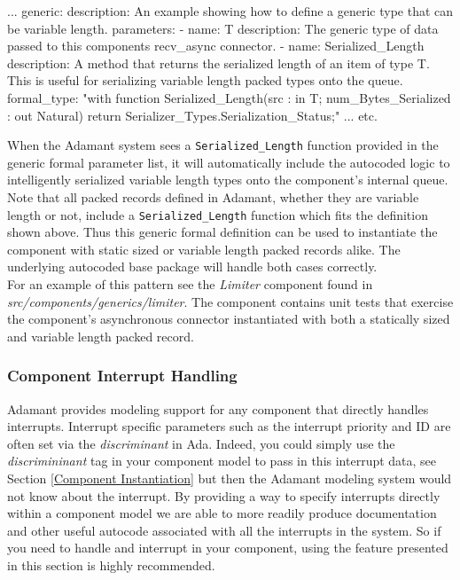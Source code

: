 \vspace{5mm} %
\begin{yamlcode}
...
generic:
  description: An example showing how to define a generic type that can be variable length.
  parameters:
    - name: T
      description: The generic type of data passed to this components recv_async connector.
    - name: Serialized_Length
      description: A method that returns the serialized length of an item of type T. This is useful for serializing variable length packed types onto the queue.
      formal_type: "with function Serialized_Length(src : in T; num_Bytes_Serialized : out Natural) return Serializer_Types.Serialization_Status;"
...
etc.
\end{yamlcode}
\vspace{5mm} %

When the Adamant system sees a \texttt{Serialized\_Length} function provided in the generic formal parameter list, it will automatically include the autocoded logic to intelligently serialized variable length types onto the component's internal queue. Note that all packed records defined in Adamant, whether they are variable length or not, include a \texttt{Serialized\_Length} function which fits the definition shown above. Thus this generic formal definition can be used to instantiate the component with static sized or variable length packed records alike. The underlying autocoded base package will handle both cases correctly. \\

For an example of this pattern see the \textit{Limiter} component found in \textit{src/components/generics/limiter}. The component contains unit tests that exercise the component's asynchronous connector instantiated with both a statically sized and variable length packed record.

\subsubsection{Component Interrupt Handling} \label{Component Interrupt Handling}

Adamant provides modeling support for any component that directly handles interrupts. Interrupt specific parameters such as the interrupt priority and ID are often set via the \textit{discriminant} in Ada. Indeed, you could simply use the \textit{discrimininant} tag in your component model to pass in this interrupt data, see Section \ref{Component Instantiation} but then the Adamant modeling system would not know about the interrupt. By providing a way to specify interrupts directly within a component model we are able to more readily produce documentation and other useful autocode associated with all the interrupts in the system. So if you need to handle and interrupt in your component, using the feature presented in this section is highly recommended. \\


